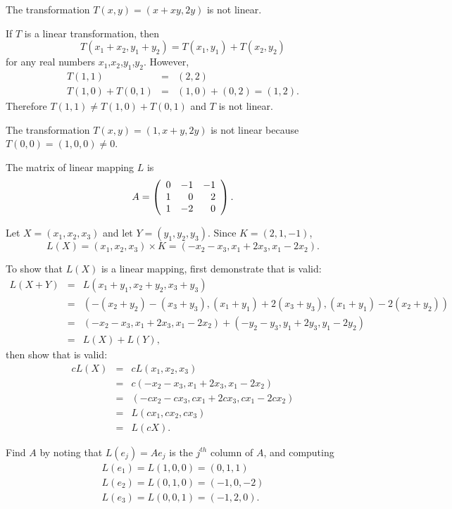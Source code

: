 \documentclass{ximera}
\begin{document}
 \ans The transformation $T(x,y) = (x + xy, 2y)$ is not linear.

\soln If $T$ is a linear transformation, then
\[
T(x_1 + x_2,y_1 + y_2) = T(x_1,y_1) + T(x_2,y_2)
\]
for any real numbers $x_1$,$x_2$,$y_1$,$y_2$.  However,
\[
\begin{array}{rcl}
T(1,1) & = & (2,2) \\
T(1,0) + T(0,1) & = & (1,0) + (0,2) = (1,2).\end{array}
\]
Therefore $T(1,1) \neq T(1,0) + T(0,1)$ and $T$ is not linear.

 The transformation $T(x,y) = (1,x + y, 2y)$ is not linear
because $T(0,0) = (1,0,0) \neq 0$.

\ans The matrix of linear mapping $L$ is
\[
A = \left(\begin{array}{rrr} 0 & -1 & -1 \\ 1 & 0 & 2 \\ 1 & -2 & 0\end{array}\right).
\]

\soln Let $X = (x_1,x_2,x_3)$ and let $Y = (y_1,y_2,y_3)$.  
Since $K = (2,1,-1)$,
\[
L(X) = (x_1,x_2,x_3) \times K = 
(-x_2 - x_3, x_1 + 2x_3, x_1 - 2x_2).
\]

To show that $L(X)$ is a linear mapping, first demonstrate that
 is valid:
\[
\begin{array}{rcl}
L(X + Y) & = & L(x_1 + y_1,x_2 + y_2,x_3 + y_3) \\
& = & (-(x_2 + y_2) - (x_3 + y_3), (x_1 + y_1) + 2(x_3 + y_3),
(x_1 + y_1) - 2(x_2 + y_2)) \\
& = & (-x_2 - x_3, x_1 + 2x_3, x_1 - 2x_2) +
(-y_2 - y_3, y_1 + 2y_3, y_1 - 2y_2) \\
& = & L(X) + L(Y), \end{array}
\]
then show that  is valid:
\[
\begin{array}{rcl}
cL(X) & = & cL(x_1,x_2,x_3) \\
& = & c(-x_2 - x_3, x_1 + 2x_3, x_1 - 2x_2) \\
& = & (-cx_2 - cx_3, cx_1 + 2cx_3, cx_1 - 2cx_2) \\
& = & L(cx_1,cx_2,cx_3) \\
& = & L(cX). \end{array}
\]

Find $A$ by noting that $L(e_j) = Ae_j$ is the $j^{th}$ column of $A$,
and computing
\[ \begin{array}{l}
L(e_1) = L(1,0,0) = (0,1,1) \\
L(e_2) = L(0,1,0) = (-1,0,-2) \\
L(e_3) = L(0,0,1) = (-1,2,0). \end{array} \]
\end{document}
